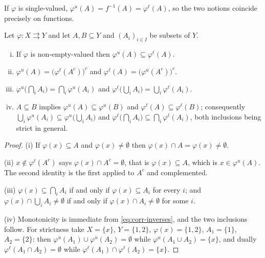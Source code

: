 If $\varphi$ is single-valued, $\varphi^{u}(A)=f^{-1}(A)=\varphi^{\ell}(A)$, so
the two notions coincide precisely on functions.

\begin{proposition}\label{prop:corr-inverse-algebra}
	Let $\varphi\colon X\rightrightarrows Y$ and let $A,B\subseteq Y$ and
	$(A_i)_{i\in I}$ be subsets of $Y$.
	\begin{enumerate}[(i)]
		\item If $\varphi$ is non-empty-valued then
		      $\varphi^{u}(A)\subseteq\varphi^{\ell}(A)$.
		\item $\varphi^{u}(A)=\bigl(\varphi^{\ell}(A^{c})\bigr)^{c}$ and
		      $\varphi^{\ell}(A)=\bigl(\varphi^{u}(A^{c})\bigr)^{c}$.
		\item $\varphi^{u}\bigl(\bigcap_iA_i\bigr)=\bigcap_i\varphi^{u}(A_i)$ and
		      $\varphi^{\ell}\bigl(\bigcup_iA_i\bigr)=\bigcup_i\varphi^{\ell}(A_i)$.
		\item $A\subseteq B$ implies $\varphi^{u}(A)\subseteq\varphi^{u}(B)$ and
		      $\varphi^{\ell}(A)\subseteq\varphi^{\ell}(B)$; consequently
		      $\bigcup_i\varphi^{u}(A_i)\subseteq\varphi^{u}\bigl(\bigcup_iA_i\bigr)$ and
		      $\varphi^{\ell}\bigl(\bigcap_iA_i\bigr)\subseteq\bigcap_i\varphi^{\ell}(A_i)$,
		      both inclusions being strict in general.
	\end{enumerate}
\end{proposition}

\begin{proof}
	(i) If $\varphi(x)\subseteq A$ and $\varphi(x)\neq\emptyset$ then
	$\varphi(x)\cap A=\varphi(x)\neq\emptyset$.

	(ii) $x\notin\varphi^{\ell}(A^{c})$ says $\varphi(x)\cap A^{c}=\emptyset$, that
	is $\varphi(x)\subseteq A$, which is $x\in\varphi^{u}(A)$. The second identity
	is the first applied to $A^{c}$ and complemented.

	(iii) $\varphi(x)\subseteq\bigcap_iA_i$ if and only if
	$\varphi(x)\subseteq A_i$ for every $i$; and
	$\varphi(x)\cap\bigcup_iA_i\neq\emptyset$ if and only if
	$\varphi(x)\cap A_i\neq\emptyset$ for some $i$.

	(iv) Monotonicity is immediate from \eqref{eq:corr-inverses}, and the two
	inclusions follow. For strictness take $X=\{x\}$, $Y=\{1,2\}$,
	$\varphi(x)=\{1,2\}$, $A_1=\{1\}$, $A_2=\{2\}$: then
	$\varphi^{u}(A_1)\cup\varphi^{u}(A_2)=\emptyset$ while
	$\varphi^{u}(A_1\cup A_2)=\{x\}$, and dually
	$\varphi^{\ell}(A_1\cap A_2)=\emptyset$ while
	$\varphi^{\ell}(A_1)\cap\varphi^{\ell}(A_2)=\{x\}$.
\end{proof}

